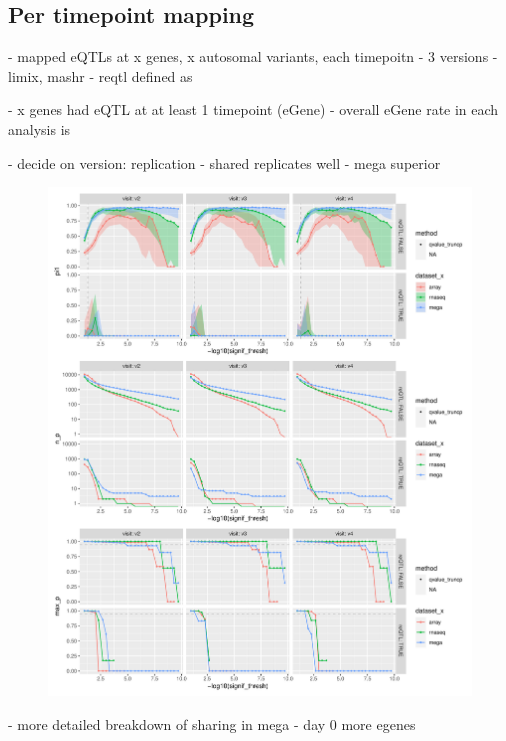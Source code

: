 \subsection{Per timepoint mapping}

- mapped eQTLs at x genes, x autosomal variants, each timepoitn
- 3 versions
- limix, mashr
- reqtl defined as

- x genes had eQTL at at least 1 timepoint (eGene)
- overall eGene rate in each analysis is

- decide on version: replication
- shared replicates well
- mega superior

\begin{figure}
    \centering
    \includegraphics[width=1.0\textwidth,page=1]{mainmatter/figures/chapter_03/compute_pi1.pi1_by_thresholds.pdf}
    \caption{}
    \label{fig:hird_eQTL_pi1vsGTExWholeBlood}
\end{figure}

- more detailed breakdown of sharing in mega
- day 0 more egenes

